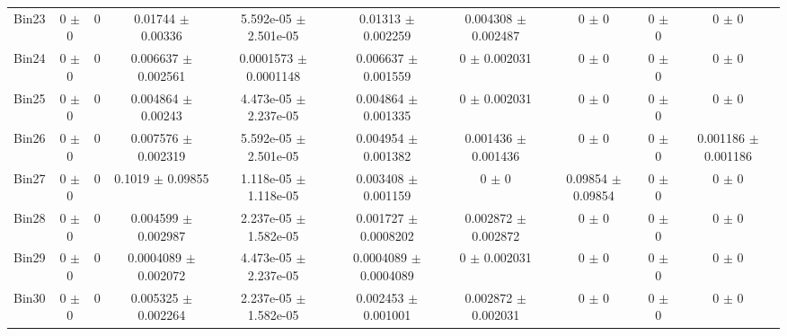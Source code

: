 \begin{tabular}{@{\extracolsep{4pt}}lccccccccc@{}}
     Bin23 & 0 $\pm$ 0 & 0 & 0.01744 $\pm$ 0.00336 & 5.592e-05 $\pm$ 2.501e-05 & 0.01313 $\pm$ 0.002259 & 0.004308 $\pm$ 0.002487 & 0 $\pm$ 0 & 0 $\pm$ 0 & 0 $\pm$ 0 \\ 
     Bin24 & 0 $\pm$ 0 & 0 & 0.006637 $\pm$ 0.002561 & 0.0001573 $\pm$ 0.0001148 & 0.006637 $\pm$ 0.001559 & 0 $\pm$ 0.002031 & 0 $\pm$ 0 & 0 $\pm$ 0 & 0 $\pm$ 0 \\ 
     Bin25 & 0 $\pm$ 0 & 0 & 0.004864 $\pm$ 0.00243 & 4.473e-05 $\pm$ 2.237e-05 & 0.004864 $\pm$ 0.001335 & 0 $\pm$ 0.002031 & 0 $\pm$ 0 & 0 $\pm$ 0 & 0 $\pm$ 0 \\ 
     Bin26 & 0 $\pm$ 0 & 0 & 0.007576 $\pm$ 0.002319 & 5.592e-05 $\pm$ 2.501e-05 & 0.004954 $\pm$ 0.001382 & 0.001436 $\pm$ 0.001436 & 0 $\pm$ 0 & 0 $\pm$ 0 & 0.001186 $\pm$ 0.001186 \\ 
     Bin27 & 0 $\pm$ 0 & 0 & 0.1019 $\pm$ 0.09855 & 1.118e-05 $\pm$ 1.118e-05 & 0.003408 $\pm$ 0.001159 & 0 $\pm$ 0 & 0.09854 $\pm$ 0.09854 & 0 $\pm$ 0 & 0 $\pm$ 0 \\ 
     Bin28 & 0 $\pm$ 0 & 0 & 0.004599 $\pm$ 0.002987 & 2.237e-05 $\pm$ 1.582e-05 & 0.001727 $\pm$ 0.0008202 & 0.002872 $\pm$ 0.002872 & 0 $\pm$ 0 & 0 $\pm$ 0 & 0 $\pm$ 0 \\ 
     Bin29 & 0 $\pm$ 0 & 0 & 0.0004089 $\pm$ 0.002072 & 4.473e-05 $\pm$ 2.237e-05 & 0.0004089 $\pm$ 0.0004089 & 0 $\pm$ 0.002031 & 0 $\pm$ 0 & 0 $\pm$ 0 & 0 $\pm$ 0 \\ 
     Bin30 & 0 $\pm$ 0 & 0 & 0.005325 $\pm$ 0.002264 & 2.237e-05 $\pm$ 1.582e-05 & 0.002453 $\pm$ 0.001001 & 0.002872 $\pm$ 0.002031 & 0 $\pm$ 0 & 0 $\pm$ 0 & 0 $\pm$ 0 \\ 
\hline\hline
  \end{tabular}
